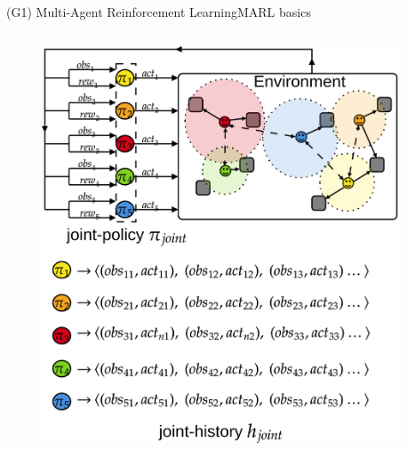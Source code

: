 \begin{frame}{(G1) Multi-Agent Reinforcement Learning}{MARL basics}

    \begin{columns}

        \hspace{-2ex}

        \begin{column}{0.4\textwidth}

            \begin{figure}
                \includegraphics[width=\linewidth]{figures/marl_basics.png}
            \end{figure}

        \end{column}

        \begin{column}{0.7\textwidth}
            \vspace{-2ex}


\end{column}
\end{columns}
\end{frame}
